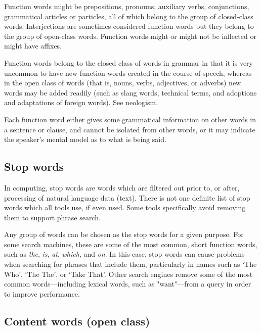       Function words might be prepositions, pronouns, auxiliary verbs, conjunctions, grammatical articles or particles, all of which belong to the group of closed-class words. Interjections are sometimes considered function words but they belong to the group of open-class words. Function words might or might not be inflected or might have affixes.

      Function words belong to the closed class of words in grammar in that it is very uncommon to have new function words created in the course of speech, whereas in the open class of words (that is, nouns, verbs, adjectives, or adverbs) new words may be added readily (such as slang words, technical terms, and adoptions and adaptations of foreign words). See neologism.

      Each function word either gives some grammatical information on other words in a sentence or clause, and cannot be isolated from other words, or it may indicate the speaker's mental model as to what is being said.
      
    \subsection{Stop words}

      In computing, stop words are words which are filtered out prior to, or after, processing of natural language data (text). There is not one definite list of stop words which all tools use, if even used. Some tools specifically avoid removing them to support phrase search.

      Any group of words can be chosen as the stop words for a given purpose. For some search machines, these are some of the most common, short function words, such as \emph{the}, \emph{is}, \emph{at}, \emph{which}, and \emph{on}. In this case, stop words can cause problems when searching for phrases that include them, particularly in names such as `The Who', `The The', or `Take That'. Other search engines remove some of the most common words—including lexical words, such as "want"—from a query in order to improve performance.

    \subsection{Content words (open class)}

